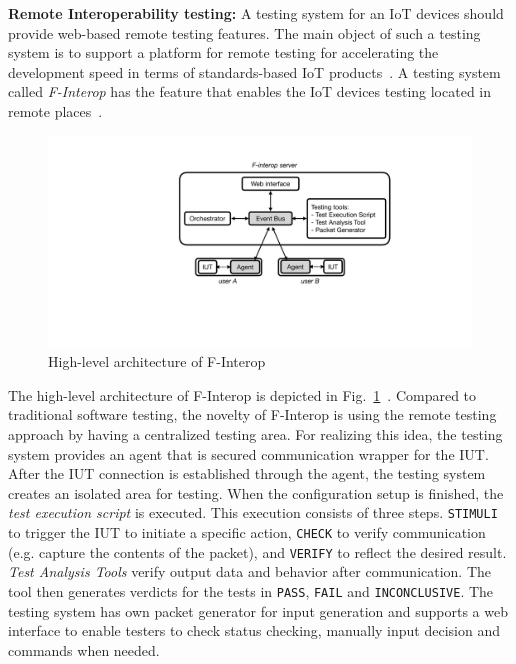 \textbf{Remote Interoperability testing:}
A testing system for an IoT devices should provide web-based remote testing features. 
The main object of such a testing system is to support a platform for remote testing for accelerating the development speed in terms of standards-based IoT products~\cite{vermesan2014internet}. A testing system called \textit{F-Interop} has the feature that enables the IoT devices testing located in remote places~\cite{ziegler2016f}.

\begin{figure}[H]			%
	\centering
	\includegraphics[width=\textwidth]{figures/fig_f-interop-arch.pdf}
    \caption{High-level architecture of F-Interop}
    \label{fig:f_interop_architecture}
\end{figure}

The high-level architecture of F-Interop is depicted in Fig.~\ref{fig:f_interop_architecture}~\cite{leone2016technical}. Compared to traditional software testing, the novelty of F-Interop is using the remote testing approach by having a centralized testing area. For realizing this idea, the testing system provides an agent that is secured communication wrapper for the IUT. After the IUT connection is established through the agent, the testing system creates an isolated area for testing. When the configuration setup is finished, the \textit{test execution script} is executed. This execution consists of three steps. \texttt{STIMULI} to trigger the IUT to initiate a specific action, \texttt{CHECK} to verify communication (e.g. capture the contents of the packet), and \texttt{VERIFY} to reflect the desired result. \textit{Test Analysis Tools} verify output data and behavior after communication. The tool then generates verdicts for the tests in \texttt{PASS}, \texttt{FAIL} and \texttt{INCONCLUSIVE}. The testing system has own packet generator for input generation and supports a web interface to enable testers to check status checking, manually input decision and commands when needed.

